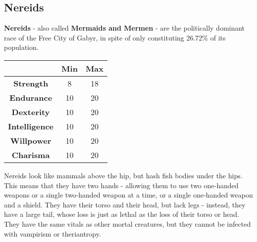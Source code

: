 \subsection{Nereids}


\textbf{Nereids} - also called \textbf{Mermaids and Mermen} - are the politically dominant race of the Free City of Gabyr, in spite of only constituting 26.72\% of its population.


\begin{tabular}{|c|c|c|}
\hline
 & \textbf{Min} & \textbf{Max} \\ \hline
\textbf{Strength} & 8 & 18 \\ \hline
\textbf{Endurance} & 10 & 20 \\ \hline
\textbf{Dexterity} & 10 & 20 \\ \hline
\textbf{Intelligence} & 10 & 20 \\ \hline
\textbf{Willpower} & 10 & 20 \\ \hline
\textbf{Charisma} & 10 & 20 \\ \hline
\end{tabular}


Nereids look like mammals above the hip, but hash fish bodies under the hips. This means that they have two hands - allowing them to use two one-handed weapons or a single two-handed weapon at a time, or a single one-handed weapon and a shield. They have their torso and their head, but lack legs - instead, they have a large tail, whose loss is just as lethal as the loss of their torso or head. They have the same vitals as other mortal creatures, but they cannot be infected with vampirism or theriantropy.\newpage
